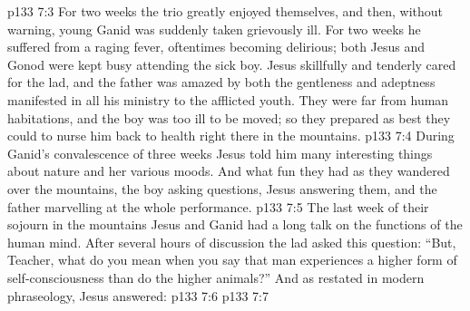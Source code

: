 \vs p133 7:3 For two weeks the trio greatly enjoyed themselves, and then, without warning, young Ganid was suddenly taken grievously ill. For two weeks he suffered from a raging fever, oftentimes becoming delirious; both Jesus and Gonod were kept busy attending the sick boy. Jesus skillfully and tenderly cared for the lad, and the father was amazed by both the gentleness and adeptness manifested in all his ministry to the afflicted youth. They were far from human habitations, and the boy was too ill to be moved; so they prepared as best they could to nurse him back to health right there in the mountains.
\vs p133 7:4 During Ganid’s convalescence of three weeks Jesus told him many interesting things about nature and her various moods. And what fun they had as they wandered over the mountains, the boy asking questions, Jesus answering them, and the father marvelling at the whole performance.
\vs p133 7:5 The last week of their sojourn in the mountains Jesus and Ganid had a long talk on the functions of the human mind. After several hours of discussion the lad asked this question: “But, Teacher, what do you mean when you say that man experiences a higher form of self\hyp{}consciousness than do the higher animals?” And as restated in modern phraseology, Jesus answered:
\vs p133 7:6 \pc {}
\vs p133 7:7 

